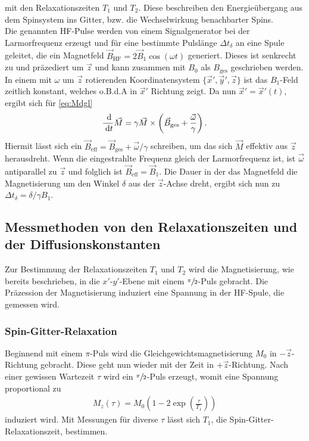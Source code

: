 mit den Relaxationszeiten $T_1$ und $T_2$. Diese beschreiben den Energieübergang aus dem Spinsystem ins Gitter, bzw. die Wechselwirkung
benachbarter Spins. \\
\noindent Die genannten HF-Pulse werden von einem Signalgenerator bei der Larmorfrequenz erzeugt und für eine bestimmte Pulslänge 
$\Delta t_\delta$ an eine Spule geleitet, die ein Magnetfeld $\vec B_\text{HF} = 2\vec B_1 \cos(\omega t)$ generiert. Dieses ist senkrecht
zu und präzediert um $\vec z$ und kann zusammen mit $B_0$ als $B_\text{ges}$ geschrieben werden. In einem mit $\omega$ um $\vec z$ 
rotierenden Koordinatensystem $\{\vec x', \vec y', \vec z\}$ ist das $B_1$-Feld zeitlich konstant, welches o.B.d.A in $\vec x'$ Richtung zeigt. 
Da nun $\vec x' = \vec x'(t)$, ergibt sich für 
\eqref{eq:Mdgl}
\begin{align}
 \frac{\; \mathrm{d} }{\; \mathrm{d} t}\vec M = \gamma \vec M  \times \left(\vec B_\text{ges} + \frac{\vec \omega}{\gamma}\right).
\end{align}
Hiermit lässt sich ein $\vec B_\text{eff} = \vec B_\text{ges} + \vec\omega/\gamma$ schreiben, um das sich $\vec M$ effektiv aus $\vec z$ herausdreht. Wenn
die eingestrahlte Frequenz gleich der Larmorfrequenz ist, ist $\vec \omega$ antiparallel zu $\vec z$ und folglich ist $\vec B_\text{eff}=\vec B_1$.
Die Dauer in der das Magnetfeld die Magnetisierung um den Winkel $\delta$ aus der $\vec z$-Achse dreht, ergibt sich nun zu
$\Delta t_\delta = \delta/\gamma B_1$.

\subsection{Messmethoden von den Relaxationszeiten und der Diffusionskonstanten}
Zur Bestimmung der Relaxationszeiten $T_1$ und $T_2$ wird die Magnetisierung, wie bereits beschrieben, in die $x'$-$y'$-Ebene mit einem 
$\sfrac{\pi}{2}$-Puls gebracht. Die Präzession der Magnetisierung induziert eine Spannung in der HF-Spule, die gemessen wird.
\subsubsection{Spin-Gitter-Relaxation}
Beginnend mit einem $\pi$-Puls wird die Gleichgewichtsmagnetisierung $M_0$ in $-\vec z$-Richtung gebracht. Diese geht nun wieder mit der Zeit 
in $+\vec z$-Richtung. Nach einer gewissen Wartezeit $\tau$ wird ein $\sfrac{\pi}{2}$-Puls erzeugt, womit eine Spannung proportional
zu
\begin{align}
 M_z(\tau) = M_0\left(1-2\exp\left(\frac{\tau}{T_1}\right)\right)
\end{align}
induziert wird. Mit Messungen für diverse $\tau$ lässt sich $T_1$, die Spin-Gitter-Relaxationszeit, bestimmen.

